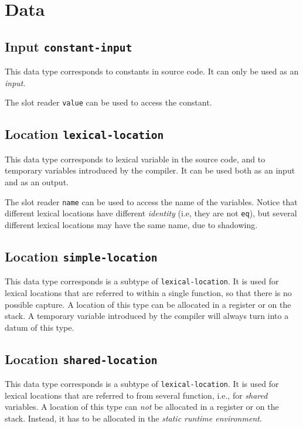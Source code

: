 \section{Data}

\subsection{Input \texttt{constant-input}}

This data type corresponds to constants in source code.  It can only
be used as an \emph{input}.

The slot reader \texttt{value} can be used to access the constant. 

\subsection{Location \texttt{lexical-location}}

This data type corresponds to lexical variable in the source code, and
to temporary variables introduced by the compiler.  It can be used
both as an input and as an output.

The slot reader \texttt{name} can be used to access the name of the
variables.  Notice that different lexical locations have different
\emph{identity} (i.e, they are not \texttt{eq}), but several different
lexical locations may have the same name, due to shadowing.

\subsection{Location \texttt{simple-location}}

This data type corresponds is a subtype of \texttt{lexical-location}.
It is used for lexical locations that are referred to within a single
function, so that there is no possible capture.  A location of this
type can be allocated in a register or on the stack.  A temporary
variable introduced by the compiler will always turn into a datum of
this type.

\subsection{Location \texttt{shared-location}}

This data type corresponds is a subtype of \texttt{lexical-location}.
It is used for lexical locations that are referred to from several
function, i.e., for \emph{shared} variables.  A location of this
type can \emph{not} be allocated in a register or on the stack.
Instead, it has to be allocated in the \emph{static runtime
  environment}. 


